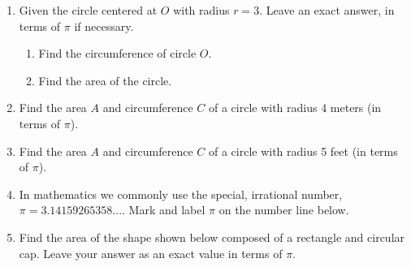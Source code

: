 \begin{enumerate}
\item Given the circle centered at $O$ with radius $r=3$. Leave an exact answer, in terms of $\pi$ if necessary.
  \begin{multicols}{2}
    \begin{enumerate}
      \item Find the circumference of circle $O$. %
      \item Find the area of the circle.\vspace{2cm}
    \end{enumerate}
  \end{multicols}

\item Find the area $A$ and circumference $C$ of a circle with radius 4 meters (in terms of $\pi$). 

\item Find the area $A$ and circumference $C$ of a circle with radius 5 feet (in terms of $\pi$). 
  
\newpage
\item In mathematics we commonly use the special, irrational number, $\pi = 3.14159265358...$. Mark and label $\pi$ on the number line below.\par \bigskip
{} \vspace{1cm}

\item Find the area of the shape shown below composed of a rectangle and circular cap. Leave your answer as an exact value in terms of $\pi$.
\begin{flushright}
\end{flushright}


\end{enumerate}

